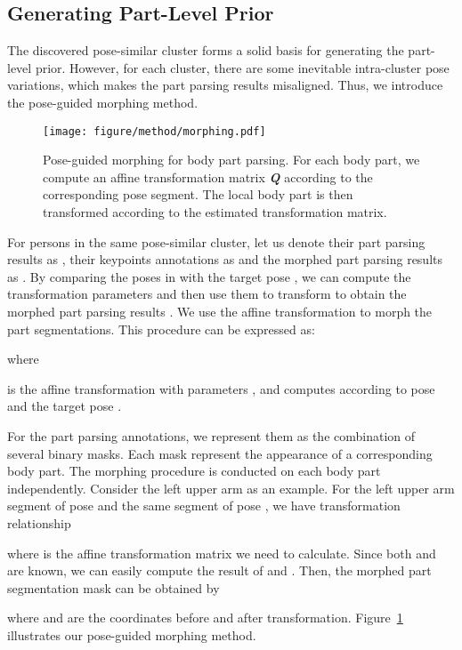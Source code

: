 \documentclass[10pt,twocolumn,letterpaper]{article}
\begin{document}
\subsection{Generating Part-Level Prior}
\label{sec:generation}
The discovered pose-similar cluster forms a solid basis for generating the part-level prior. However, for each cluster, there are some inevitable intra-cluster pose variations, which makes the part parsing results misaligned. Thus, we introduce the pose-guided morphing method.
\begin{figure}[t]
\begin{center}
\texttt{[image: figure/method/morphing.pdf]}
\end{center}
\vspace{-4mm}
   \caption{Pose-guided morphing for body part parsing. For each body part, we compute an affine transformation matrix \textbf{\emph{Q}} according to the corresponding pose segment. The local body part is then transformed according to the estimated transformation matrix.}
   \vspace{-3mm}
\label{fig:morphing}
\end{figure}

For  persons in the same pose-similar cluster, let us denote their part parsing results as , their keypoints annotations as  and the morphed part parsing results as . By comparing the poses in  with the target pose , we can compute the transformation parameters  and then use them to transform  to obtain the morphed part parsing results . We use the affine transformation to morph the part segmentations. This procedure can be expressed as:

where

 is the affine transformation with parameters , and  computes  according to pose  and the target pose .

For the part parsing annotations, we represent them as the combination of several binary masks. Each mask represent the appearance of a corresponding body part. The morphing procedure is conducted on each body part independently. Consider the left upper arm as an example. For the left upper arm segment  of pose  and the same segment  of pose , we have transformation relationship

where  is the affine transformation matrix we need to calculate. Since both  and  are known, we can easily compute the result of  and . Then, the morphed part segmentation mask can be obtained by

where  and  are the coordinates before and after transformation. Figure~\ref{fig:morphing} illustrates our pose-guided morphing method.
\end{document}
